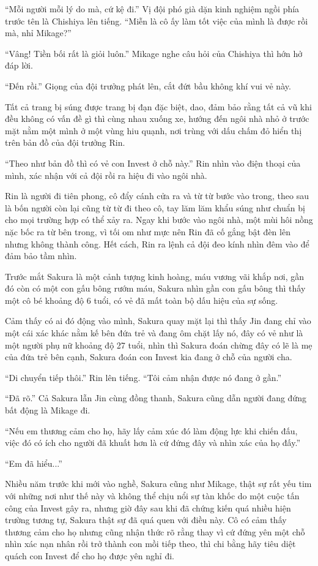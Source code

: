 {``Mỗi người mỗi lý do mà, cứ kệ đi.'' Vị đội phó già dặn kinh nghiệm
ngồi phía trước tên là Chishiya lên tiếng. ``Miễn là cô ấy làm tốt việc
của mình là được rồi mà, nhỉ Mikage?''

``Vâng! Tiền bối rất là giỏi luôn.'' Mikage nghe câu hỏi của Chishiya
thì hớn hở đáp lời.

``Đến rồi.'' Giọng của đội trưởng phát lên, cắt đứt bầu không khí vui vẻ
này.

Tất cả trang bị súng được trang bị đạn đặc biệt, dao, đảm bảo rằng tất
cả vũ khi đều không có vấn đề gì thì cùng nhau xuống xe, hướng đến ngôi
nhà nhỏ ở trước mặt nằm một mình ở một vùng hiu quạnh, nơi trùng với dấu
chấm đỏ hiển thị trên bản đồ của đội trưởng Rin.

``Theo như bản đồ thì có vẻ con Invest ở chỗ này.'' Rin nhìn vào điện
thoại của mình, xác nhận với cả đội rồi ra hiệu đi vào ngôi nhà.

Rin là người đi tiên phong, cô đẩy cánh cửa ra và từ từ bước vào trong,
theo sau là bốn người còn lại cũng từ từ đi theo cô, tay lăm lăm khẩu
súng như chuẩn bị cho mọi trường hợp có thể xảy ra. Ngay khi bước vào
ngôi nhà, một mùi hôi nồng nặc bốc ra từ bên trong, vì tối om như mực
nên Rin đã cố gắng bật đèn lên nhưng không thành công. Hết cách, Rin ra
lệnh cả đội đeo kính nhìn đêm vào để đảm bảo tầm nhìn.

Trước mắt Sakura là một cảnh tượng kinh hoàng, máu vương vãi khắp nơi,
gần đó còn có một con gấu bông rướm máu, Sakura nhìn gần con gấu bông
thì thấy một cô bé khoảng độ 6 tuổi, có vẻ đã mất toàn bộ dấu hiệu của
sự sống.

Cảm thấy có ai đó động vào mình, Sakura quay mặt lại thì thấy Jin đang
chỉ vào một cái xác khác nằm kế bên đứa trẻ và đang ôm chặt lấy nó, đây
có vẻ như là một người phụ nữ khoảng độ 27 tuổi, nhìn thì Sakura đoán
chừng đây có lẽ là mẹ của đứa trẻ bên cạnh, Sakura đoán con Invest kia
đang ở chỗ của người cha.

``Di chuyển tiếp thôi.'' Rin lên tiếng. ``Tôi cảm nhận được nó đang ở
gần.''

``Đã rõ.'' Cả Sakura lẫn Jin cùng đồng thanh, Sakura cũng dẫn người đang
đứng bất động là Mikage đi.

``Nếu em thương cảm cho họ, hãy lấy cảm xúc đó làm động lực khi chiến
đấu, việc đó có ích cho người đã khuất hơn là cứ đứng đây và nhìn xác
của họ đấy.''

``Em đã hiểu...''

Nhiều năm trước khi mới vào nghề, Sakura cũng như Mikage, thật sự rất
yếu tim với những nơi như thế này và không thể chịu nổi sự tàn khốc do
một cuộc tấn công của Invest gây ra, nhưng giờ đây sau khi đã chứng kiến
quá nhiều hiện trường tương tự, Sakura thật sự đã quá quen với điều này.
Cô có cảm thấy thương cảm cho họ nhưng cũng nhận thức rõ rằng thay vì cứ
đứng yên một chỗ nhìn xác nạn nhân rồi trở thành con mồi tiếp theo, thì
chi bằng hãy tiêu diệt quách con Invest để cho họ được yên nghỉ đi.

}
